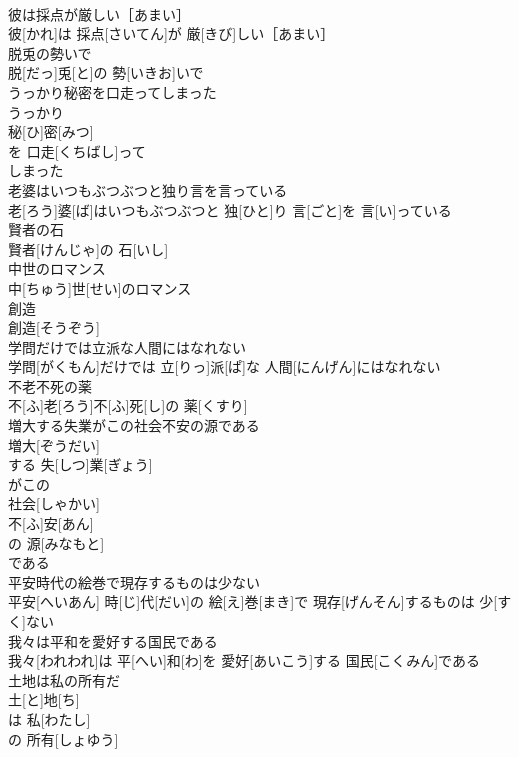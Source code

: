 \documentclass[8pt]{extreport}
\begin{document}
\begin{CJK}{UTF8}{min}
\\	彼は採点が厳しい［あまい］	
\\	彼[かれ]は 採点[さいてん]が 厳[きび]しい［あまい］
\\	脱兎の勢いで	
\\	脱[だっ]兎[と]の 勢[いきお]いで
\\	うっかり秘密を口走ってしまった	
\\	うっかり 
\\	秘[ひ]密[みつ]
\\	を 口走[くちばし]って 
\\	しまった 
\\	老婆はいつもぶつぶつと独り言を言っている	
\\	老[ろう]婆[ば]はいつもぶつぶつと 独[ひと]り 言[ごと]を 言[い]っている
\\	賢者の石	
\\	賢者[けんじゃ]の 石[いし]
\\	中世のロマンス	
\\	中[ちゅう]世[せい]のロマンス
\\	創造	
\\	創造[そうぞう]
\\	学問だけでは立派な人間にはなれない	
\\	学問[がくもん]だけでは 立[りっ]派[ぱ]な 人間[にんげん]にはなれない
\\	不老不死の薬	
\\	不[ふ]老[ろう]不[ふ]死[し]の 薬[くすり]
\\	増大する失業がこの社会不安の源である	
\\	増大[ぞうだい]
\\	する 失[しつ]業[ぎょう]
\\	がこの 
\\	社会[しゃかい] 
\\	不[ふ]安[あん]
\\	の 源[みなもと]
\\	である
\\	平安時代の絵巻で現存するものは少ない	
\\	平安[へいあん] 時[じ]代[だい]の 絵[え]巻[まき]で 現存[げんそん]するものは 少[すく]ない
\\	我々は平和を愛好する国民である	
\\	我々[われわれ]は 平[へい]和[わ]を 愛好[あいこう]する 国民[こくみん]である
\\	土地は私の所有だ	
\\	土[と]地[ち]
\\	は 私[わたし]
\\	の 所有[しょゆう]

\end{CJK}
\end{document}
